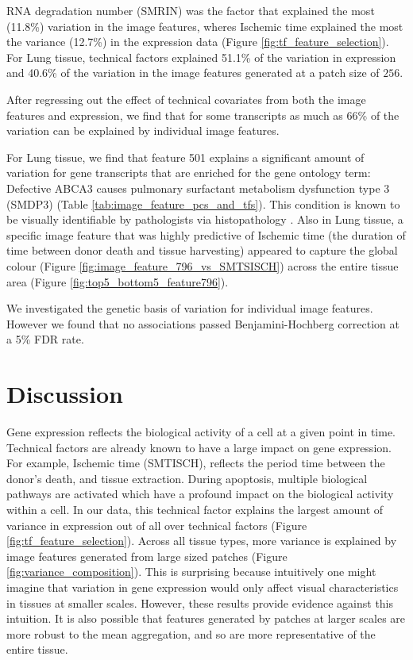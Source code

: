 \documentclass{article}
\begin{document}
RNA degradation number (SMRIN) was the factor that explained the most (11.8\%) variation in the image features, wheres Ischemic time explained the most the variance (12.7\%) in the expression data (Figure \ref{fig:tf_feature_selection}). For Lung tissue, technical factors explained 51.1\% of the variation in expression and 40.6\% of the variation in the image features generated at a patch size of $256$.

After regressing out the effect of technical covariates from both the image features and expression, we find that for some transcripts as much as 66\% of the variation can be explained by individual image features.

For Lung tissue, we find that feature 501 explains a significant amount of variation for gene transcripts that are enriched for the gene ontology term: Defective ABCA3 causes pulmonary surfactant metabolism dysfunction type 3 (SMDP3) (Table \ref{tab:image_feature_pcs_and_tfs}). This condition is known to be visually identifiable by pathologists via histopathology \cite{surfectant-dysfunction}.  Also in Lung tissue, a specific image feature that was highly predictive of Ischemic time (the duration of time between donor death and tissue harvesting) appeared to capture the global colour (Figure \ref{fig:image_feature_796_vs_SMTSISCH}) across the entire tissue area (Figure \ref{fig:top5_bottom5_feature796}).

We investigated the genetic basis of variation for individual image features. However we found that no associations passed Benjamini-Hochberg correction at a 5\% FDR rate.

\section{Discussion}

Gene expression reflects the biological activity of a cell at a given point in time. Technical factors are already known to have a large impact on gene expression. For example, Ischemic time (SMTISCH), reflects the period time between the donor's death, and tissue extraction. During apoptosis, multiple biological pathways are activated which have a profound impact on the biological activity within a cell. In our data, this technical factor explains the largest amount of variance in expression out of all over technical factors (Figure \ref{fig:tf_feature_selection}). Across all tissue types, more variance is explained by image features generated from large sized patches (Figure \ref{fig:variance_composition}). This is surprising because intuitively one might imagine that variation in gene expression would only affect visual characteristics in tissues at smaller scales. However, these results provide evidence against this intuition. It is also possible that features generated by patches at larger scales are more robust to the mean aggregation, and so are more representative of the entire tissue.
\end{document}
